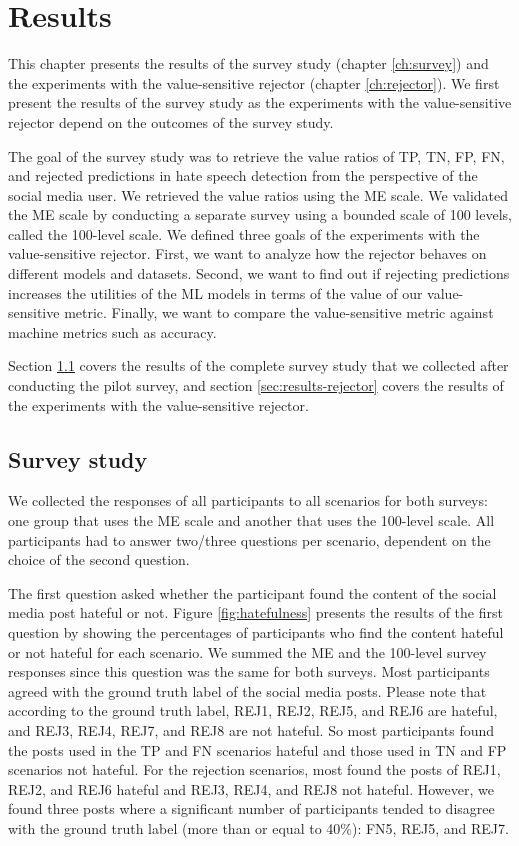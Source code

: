 \chapter{Results}
\label{ch:results}
This chapter presents the results of the survey study (chapter \ref{ch:survey}) and the experiments with the value-sensitive rejector (chapter \ref{ch:rejector}).
%
We first present the results of the survey study as the experiments with the value-sensitive rejector depend on the outcomes of the survey study.
%

%
The goal of the survey study was to retrieve the value ratios of TP, TN, FP, FN, and rejected predictions in hate speech detection from the perspective of the social media user.
%
We retrieved the value ratios using the ME scale.
%
We validated the ME scale by conducting a separate survey using a bounded scale of 100 levels, called the 100-level scale.
%
We defined three goals of the experiments with the value-sensitive rejector.
%
First, we want to analyze how the rejector behaves on different models and datasets.
%
Second, we want to find out if rejecting predictions increases the utilities of the ML models in terms of the value of our value-sensitive metric.
%
Finally, we want to compare the value-sensitive metric against machine metrics such as accuracy.
%

%
Section \ref{sec:results-survey-study} covers the results of the complete survey study that we collected after conducting the pilot survey, and section \ref{sec:results-rejector} covers the results of the experiments with the value-sensitive rejector.

\section{Survey study}
\label{sec:results-survey-study}
We collected the responses of all participants to all scenarios for both surveys: one group that uses the ME scale and another that uses the 100-level scale.
%
All participants had to answer two/three questions per scenario, dependent on the choice of the second question.
%

%
The first question asked whether the participant found the content of the social media post hateful or not.
%
Figure \ref{fig:hatefulness} presents the results of the first question by showing the percentages of participants who find the content hateful or not hateful for each scenario.
%
We summed the ME and the 100-level survey responses since this question was the same for both surveys.
%
Most participants agreed with the ground truth label of the social media posts.
%
Please note that according to the ground truth label, REJ1, REJ2, REJ5, and REJ6 are hateful, and REJ3, REJ4, REJ7, and REJ8 are not hateful.
%
So most participants found the posts used in the TP and FN scenarios hateful and those used in TN and FP scenarios not hateful.
%
For the rejection scenarios, most found the posts of REJ1, REJ2, and REJ6 hateful and REJ3, REJ4, and REJ8 not hateful.
%
However, we found three posts where a significant number of participants tended to disagree with the ground truth label (more than or equal to 40\%): FN5, REJ5, and REJ7.
%

